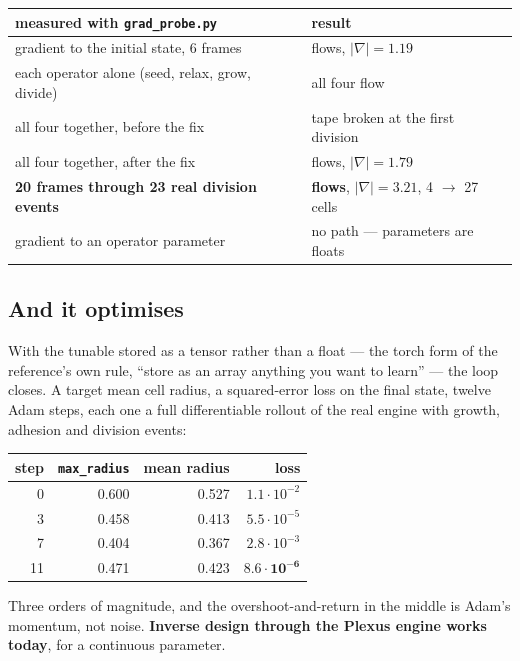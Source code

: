 \documentclass[11pt,a4paper]{article}
\newcommand{\code}[1]{\texttt{#1}}
\begin{document}
\begin{center}
\small
\begin{tabular}{@{}l l@{}}
\toprule
\textbf{measured with \code{grad\_probe.py}} & \textbf{result}\\
\midrule
gradient to the initial state, 6 frames & flows, $|\nabla| = 1.19$\\
each operator alone (seed, relax, grow, divide) & all four flow\\
all four together, before the fix & \textcolor{bad}{tape broken at the first division}\\
all four together, after the fix & flows, $|\nabla| = 1.79$\\
\textbf{20 frames through 23 real division events} & \textbf{flows}, $|\nabla| = 3.21$, 4 $\to$ 27 cells\\
gradient to an operator parameter & \textcolor{bad}{no path --- parameters are floats}\\
\bottomrule
\end{tabular}
\end{center}

\subsection{And it optimises}

With the tunable stored as a tensor rather than a float --- the torch form of the reference's own
rule, ``store as an array anything you want to learn'' --- the loop closes. A target mean cell
radius, a squared-error loss on the final state, twelve Adam steps, each one a full differentiable
rollout of the real engine with growth, adhesion and division events:

\begin{center}
\small
\begin{tabular}{@{}r r r r@{}}
\toprule
step & \code{max\_radius} & mean radius & loss\\
\midrule
0 & 0.600 & 0.527 & $1.1{\cdot}10^{-2}$\\
3 & 0.458 & 0.413 & $5.5{\cdot}10^{-5}$\\
7 & 0.404 & 0.367 & $2.8{\cdot}10^{-3}$\\
11 & 0.471 & 0.423 & $\mathbf{8.6{\cdot}10^{-6}}$\\
\bottomrule
\end{tabular}
\end{center}

Three orders of magnitude, and the overshoot-and-return in the middle is Adam's momentum, not
noise. \textbf{Inverse design through the Plexus engine works today}, for a continuous parameter.
\end{document}

